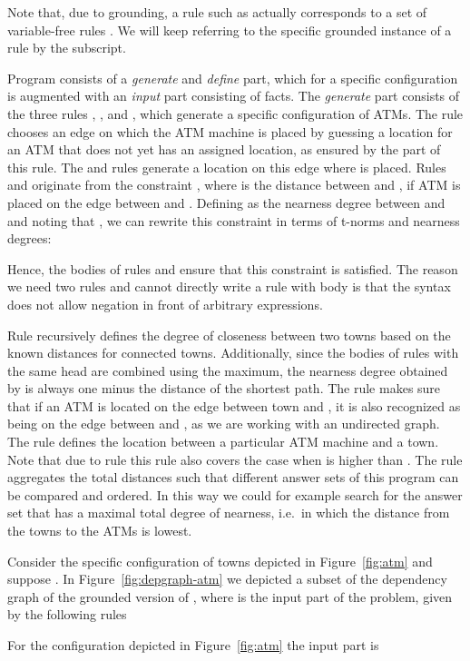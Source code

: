 \documentclass{tlp}
\begin{document}
Note that, due to grounding, a rule such as  actually corresponds to a set of variable-free rules . We will keep referring to the specific grounded instance of a rule by the subscript.

Program  consists of a \emph{generate} and \emph{define} part, which for a specific configuration is augmented with an \emph{input} part consisting of facts. The \emph{generate} part consists of the three rules , , and , which generate a specific configuration of ATMs. The  rule chooses an edge on which the ATM machine  is placed by guessing a location for an ATM that does not yet has an assigned location, as ensured by the  part of this rule. The  and  rules generate a location on this edge where  is placed. Rules  and  originate from the constraint , where  is the distance between  and , if ATM  is placed on the edge between  and . Defining  as the nearness degree between  and  and noting that , we can rewrite this constraint in terms of t-norms and nearness degrees:
 
Hence, the bodies of rules  and  ensure that this constraint is satisfied. The reason we need two rules and cannot directly write a rule with body  is that the syntax does not allow negation in front of arbitrary expressions.


Rule  recursively defines the degree of closeness between two towns based on the known distances for connected towns.  Additionally, since the bodies of rules with the same head are combined using the maximum, the nearness degree obtained by  is always one minus the distance of the shortest path. The  rule makes sure that if an ATM is located on the edge between town  and , it is also recognized as being on the edge between  and , as we are working with an undirected graph. The  rule defines the location between a particular ATM machine and a town. Note that due to rule  this rule also covers the case when  is higher than . The  rule aggregates the total distances such that different answer sets of this program can be compared and ordered. In this way we could for example search for the answer set that has a maximal total degree of nearness, i.e.~in which the distance from the towns to the ATMs is lowest.


Consider the specific configuration  of towns  depicted in Figure~\ref{fig:atm} and suppose . In Figure~\ref{fig:depgraph-atm} we depicted a subset of the dependency graph of the grounded version of , where  is the input part of the problem, given by the following rules

For the configuration depicted in Figure~\ref{fig:atm} the input part  is
\end{document}
